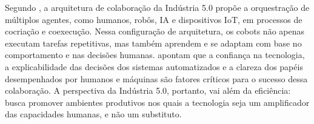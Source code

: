 Segundo , a arquitetura de colaboração da Indústria 5.0 propõe a orquestração de múltiplos agentes, como humanos, robôs, \gls{IA} e dispositivos \gls{IoT}, em processos de cocriação e coexecução.
Nessa configuração de arquitetura, os cobots não apenas executam tarefas repetitivas, mas também aprendem e se adaptam com base no comportamento e nas decisões humanas.  apontam que a confiança na tecnologia, a explicabilidade das decisões dos sistemas automatizados e a clareza dos papéis desempenhados por humanos e máquinas são fatores críticos para o sucesso dessa colaboração.
A perspectiva da Indústria 5.0, portanto, vai além da eficiência: busca promover ambientes produtivos nos quais a tecnologia seja um amplificador das capacidades humanas, e não um substituto.


